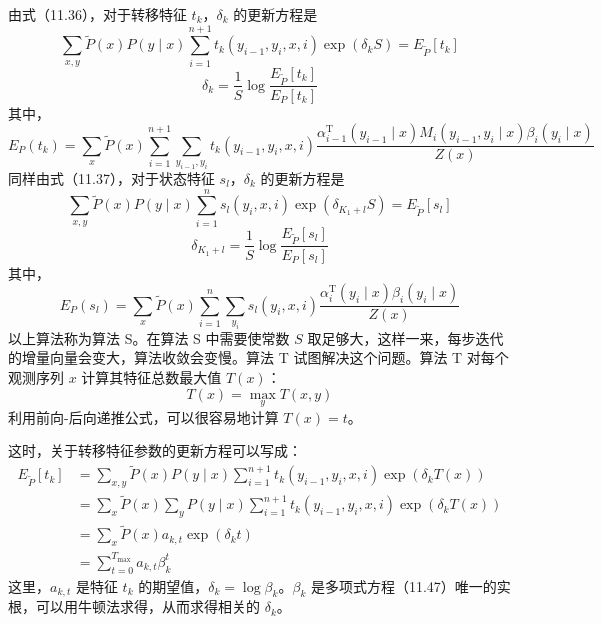 \documentclass[UTF8, 12pt, fontset=fandol, oneside]{ctexart}
\begin{document}
由式（11.36），对于转移特征 $t_k$，$\delta_k$ 的更新方程是
\begin{equation}
\sum_{x,y}\tilde P(x)P(y\mid x)\sum_{i=1}^{n+1}t_k(y_{i-1},y_i,x,i)\exp(\delta_kS)=E_{\tilde P}[t_k]
\tag{11.40}
\end{equation}
\begin{equation}
\delta_k=\frac{1}{S}\log\frac{E_{\tilde P}[t_k]}{E_P[t_k]}
\tag{11.41}
\end{equation}
其中，
\begin{equation}
E_P(t_k)=\sum_x\tilde P(x)\sum_{i=1}^{n+1}\sum_{y_{i-1},y_i}
t_k(y_{i-1},y_i,x,i)
\frac{\alpha_{i-1}^{\mathrm T}(y_{i-1}\mid x)M_i(y_{i-1},y_i\mid x)\beta_i(y_i\mid x)}{Z(x)}
\tag{11.42}
\end{equation}
同样由式（11.37），对于状态特征 $s_l$，$\delta_k$ 的更新方程是
\begin{equation}
\sum_{x,y}\tilde P(x)P(y\mid x)\sum_{i=1}^{n}s_l(y_i,x,i)\exp(\delta_{K_1+l}S)=E_{\tilde P}[s_l]
\tag{11.43}
\end{equation}
\begin{equation}
\delta_{K_1+l}=\frac{1}{S}\log\frac{E_{\tilde P}[s_l]}{E_P[s_l]}
\tag{11.44}
\end{equation}
其中，
\begin{equation}
E_P(s_l)=\sum_x\tilde P(x)\sum_{i=1}^{n}\sum_{y_i}
s_l(y_i,x,i)\frac{\alpha_i^{\mathrm T}(y_i\mid x)\beta_i(y_i\mid x)}{Z(x)}
\tag{11.45}
\end{equation}
以上算法称为算法 S。在算法 S 中需要使常数 $S$ 取足够大，这样一来，每步迭代的增量向量会变大，算法收敛会变慢。算法 T 试图解决这个问题。算法 T 对每个观测序列 $x$ 计算其特征总数最大值 $T(x)$：
\begin{equation}
T(x)=\max_y T(x,y)
\tag{11.46}
\end{equation}
利用前向-后向递推公式，可以很容易地计算 $T(x)=t$。

这时，关于转移特征参数的更新方程可以写成：
\begin{equation}
\begin{aligned}
E_{\tilde P}[t_k]
&=\sum_{x,y}\tilde P(x)P(y\mid x)\sum_{i=1}^{n+1}t_k(y_{i-1},y_i,x,i)\exp(\delta_kT(x))\\
&=\sum_x\tilde P(x)\sum_yP(y\mid x)\sum_{i=1}^{n+1}t_k(y_{i-1},y_i,x,i)\exp(\delta_kT(x))\\
&=\sum_x\tilde P(x)a_{k,t}\exp(\delta_kt)\\
&=\sum_{t=0}^{T_{\max}}a_{k,t}\beta_k^t
\end{aligned}
\tag{11.47}
\end{equation}
这里，$a_{k,t}$ 是特征 $t_k$ 的期望值，$\delta_k=\log\beta_k$。$\beta_k$ 是多项式方程（11.47）唯一的实根，可以用牛顿法求得，从而求得相关的 $\delta_k$。
\end{document}
